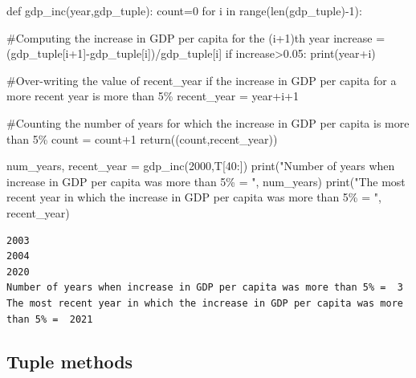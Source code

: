 \documentclass[
  letterpaper,
  DIV=11,
  numbers=noendperiod]{scrreprt}
\newenvironment{Shaded}{\begin{snugshade}}{\end{snugshade}}
\newcommand{\BuiltInTok}[1]{\textcolor[rgb]{0.00,0.23,0.31}{#1}}
\newcommand{\CommentTok}[1]{\textcolor[rgb]{0.37,0.37,0.37}{#1}}
\newcommand{\ControlFlowTok}[1]{\textcolor[rgb]{0.00,0.23,0.31}{#1}}
\newcommand{\DecValTok}[1]{\textcolor[rgb]{0.68,0.00,0.00}{#1}}
\newcommand{\FloatTok}[1]{\textcolor[rgb]{0.68,0.00,0.00}{#1}}
\newcommand{\KeywordTok}[1]{\textcolor[rgb]{0.00,0.23,0.31}{#1}}
\newcommand{\NormalTok}[1]{\textcolor[rgb]{0.00,0.23,0.31}{#1}}
\newcommand{\OperatorTok}[1]{\textcolor[rgb]{0.37,0.37,0.37}{#1}}
\newcommand{\StringTok}[1]{\textcolor[rgb]{0.13,0.47,0.30}{#1}}
\begin{document}
\begin{Shaded}
\begin{Highlighting}[]
\KeywordTok{def}\NormalTok{ gdp\_inc(year,gdp\_tuple):}
\NormalTok{    count}\OperatorTok{=}\DecValTok{0}
    \ControlFlowTok{for}\NormalTok{ i }\KeywordTok{in} \BuiltInTok{range}\NormalTok{(}\BuiltInTok{len}\NormalTok{(gdp\_tuple)}\OperatorTok{{-}}\DecValTok{1}\NormalTok{):}
        
        \CommentTok{\#Computing the increase in GDP per capita for the (i+1)th year}
\NormalTok{        increase }\OperatorTok{=}\NormalTok{ (gdp\_tuple[i}\OperatorTok{+}\DecValTok{1}\NormalTok{]}\OperatorTok{{-}}\NormalTok{gdp\_tuple[i])}\OperatorTok{/}\NormalTok{gdp\_tuple[i]}
        \ControlFlowTok{if}\NormalTok{ increase}\OperatorTok{\textgreater{}}\FloatTok{0.05}\NormalTok{:}
            \BuiltInTok{print}\NormalTok{(year}\OperatorTok{+}\NormalTok{i)}
            
            \CommentTok{\#Over{-}writing the value of recent\_year if the increase in GDP per capita for a more recent year is more than 5\%}
\NormalTok{            recent\_year }\OperatorTok{=}\NormalTok{ year}\OperatorTok{+}\NormalTok{i}\OperatorTok{+}\DecValTok{1}
            
            \CommentTok{\#Counting the number of years for which the increase in GDP per capita is more than 5\%}
\NormalTok{            count }\OperatorTok{=}\NormalTok{ count}\OperatorTok{+}\DecValTok{1}
    \ControlFlowTok{return}\NormalTok{((count,recent\_year))}

\NormalTok{num\_years, recent\_year }\OperatorTok{=}\NormalTok{ gdp\_inc(}\DecValTok{2000}\NormalTok{,T[}\DecValTok{40}\NormalTok{:])}
\BuiltInTok{print}\NormalTok{(}\StringTok{"Number of years when increase in GDP per capita was more than 5\% = "}\NormalTok{, num\_years)}
\BuiltInTok{print}\NormalTok{(}\StringTok{"The most recent year in which the increase in GDP per capita was more than 5\% = "}\NormalTok{, recent\_year)}
\end{Highlighting}
\end{Shaded}

\begin{verbatim}
2003
2004
2020
Number of years when increase in GDP per capita was more than 5% =  3
The most recent year in which the increase in GDP per capita was more than 5% =  2021
\end{verbatim}

\hypertarget{tuple-methods}{%
\subsection{Tuple methods}\label{tuple-methods}}
\end{document}
